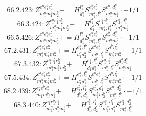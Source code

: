 \documentclass[letterpaper,10pt,fleqn,leqno,onecolumn]{article}
\begin{document}
\begin{equation} \;\;\;\;\;\;  66.2.423: Z^{e_{1}^{a}e_{1}^{b}e_{2}^{b}}_{m_{1}^{a}m_{1}^{b}m_{2}^{b}}+=H^{l_{1}^{b}}_{d_{1}^{b}}S^{e_{1}^{b}e_{2}^{b}}_{m_{1}^{b},l_{1}^{b}}S^{e_{1}^{a},d_{1}^{b}}_{m_{1}^{a}m_{2}^{b}}\cdot -1/1 \end{equation}
\begin{equation} \;\;\;\;\;\;  66.3.424: Z^{e_{1}^{a}e_{1}^{b}e_{2}^{b}}_{m_{1}^{a}m_{1}^{b}m_{2}^{b}}+=H^{l_{1}^{b}}_{d_{1}^{b}}S^{e_{1}^{a}e_{1}^{b}}_{m_{1}^{a},l_{1}^{b}}S^{e_{2}^{b},d_{1}^{b}}_{m_{1}^{b}m_{2}^{b}} \end{equation}
\begin{equation} \;\;\;\;\;\;  66.5.426: Z^{e_{1}^{a}e_{1}^{b}e_{2}^{b}}_{m_{1}^{a}m_{1}^{b}m_{2}^{b}}+=H^{l_{1}^{a}}_{d_{1}^{a}}S^{e_{1}^{a}e_{1}^{b}}_{m_{1}^{b},l_{1}^{a}}S^{e_{2}^{b},d_{1}^{a}}_{m_{1}^{a}m_{2}^{b}}\cdot -1/1 \end{equation}
\begin{equation} \;\;\;\;\;\;  67.2.431: Z^{e_{1}^{a}e_{1}^{b}e_{2}^{b}}_{m_{1}^{a}m_{1}^{b}m_{2}^{b}}+=H^{e_{1}^{b},l_{1}^{b}}_{d_{1}^{b}d_{2}^{b}}S^{e_{1}^{a}e_{2}^{b}}_{m_{1}^{a},l_{1}^{b}}S^{d_{1}^{b}d_{2}^{b}}_{m_{1}^{b}m_{2}^{b}}\cdot -1/1 \end{equation}
\begin{equation} \;\;\;\;\;\;  67.3.432: Z^{e_{1}^{a}e_{1}^{b}e_{2}^{b}}_{m_{1}^{a}m_{1}^{b}m_{2}^{b}}+=H^{e_{1}^{b},l_{1}^{a}}_{d_{1}^{a}d_{1}^{b}}S^{e_{1}^{a}e_{2}^{b}}_{m_{1}^{b},l_{1}^{a}}S^{d_{1}^{a}d_{1}^{b}}_{m_{1}^{a}m_{2}^{b}} \end{equation}
\begin{equation} \;\;\;\;\;\;  67.5.434: Z^{e_{1}^{a}e_{1}^{b}e_{2}^{b}}_{m_{1}^{a}m_{1}^{b}m_{2}^{b}}+=H^{e_{1}^{a},l_{1}^{b}}_{d_{1}^{a}d_{1}^{b}}S^{e_{1}^{b}e_{2}^{b}}_{m_{1}^{b},l_{1}^{b}}S^{d_{1}^{a}d_{1}^{b}}_{m_{1}^{a}m_{2}^{b}}\cdot -1/1 \end{equation}
\begin{equation} \;\;\;\;\;\;  68.2.439: Z^{e_{1}^{a}e_{1}^{b}e_{2}^{b}}_{m_{1}^{a}m_{1}^{b}m_{2}^{b}}+=H^{e_{1}^{b},l_{1}^{b}}_{d_{1}^{b},d_{2}^{b}}S^{e_{2}^{b},d_{1}^{b}}_{m_{1}^{b}m_{2}^{b}}S^{e_{1}^{a},d_{2}^{b}}_{m_{1}^{a},l_{1}^{b}}\cdot -1/1 \end{equation}
\begin{equation} \;\;\;\;\;\;  68.3.440: Z^{e_{1}^{a}e_{1}^{b}e_{2}^{b}}_{m_{1}^{a}m_{1}^{b}m_{2}^{b}}+=H^{e_{1}^{b},l_{1}^{b}}_{d_{1}^{b},d_{2}^{b}}S^{e_{1}^{a},d_{1}^{b}}_{m_{1}^{a}m_{1}^{b}}S^{e_{2}^{b},d_{2}^{b}}_{m_{2}^{b},l_{1}^{b}} \end{equation}
\end{document}
